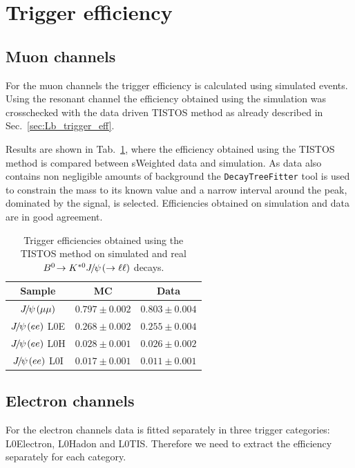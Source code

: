 \section{Trigger efficiency}
\label{sec:RKst_trigger_eff}

\subsection{Muon channels}

For the muon channels the trigger efficiency is calculated using simulated events.
Using the resonant channel the efficiency obtained using the simulation
was crosschecked with the data driven TISTOS method as already described in Sec.~\ref{sec:Lb_trigger_eff}.

Results are shown in Tab.~\ref{tab:tistos}, where the efficiency
obtained using the TISTOS method is compared between sWeighted data and simulation.
As data also contains non negligible amounts of background
the \verb!DecayTreeFitter! tool is used to constrain the \jpsi mass to its known value
and a narrow interval around the peak, dominated by the signal, is selected.
Efficiencies obtained on simulation and data are in good agreement.

\begin{table}[hb!]
\begin{center}
 \caption{Trigger efficiencies obtained using the TISTOS method on
 simulated and real $\decay{\Bz}{\Kstarz\jpsi(\to\ell\ell)}$ decays.}
\begin{tabular}{|c|c|c|}
\hline
 Sample 							&  MC  			& Data 	\\ \hline
 $\jpsi(\mu\mu)$	& $ 0.797  \pm  0.002 $ & $ 0.803  \pm  0.004 $  \\
 $\jpsi(ee)$ L0E 	& $ 0.268  \pm  0.002 $ & $ 0.255  \pm  0.004 $  \\
 $\jpsi(ee)$ L0H 	& $ 0.028  \pm  0.001 $ & $ 0.026  \pm  0.002 $  \\
 $\jpsi(ee)$ L0I 	& $ 0.017  \pm  0.001 $ & $ 0.011  \pm  0.001 $  \\
 \hline 
  \end{tabular}
\label{tab:tistos}
\end{center}
\end{table}

\subsection{Electron channels}

For the electron channels data is fitted separately in three trigger categories: L0Electron, L0Hadon and L0TIS.
Therefore we need to extract the efficiency separately for each category.

